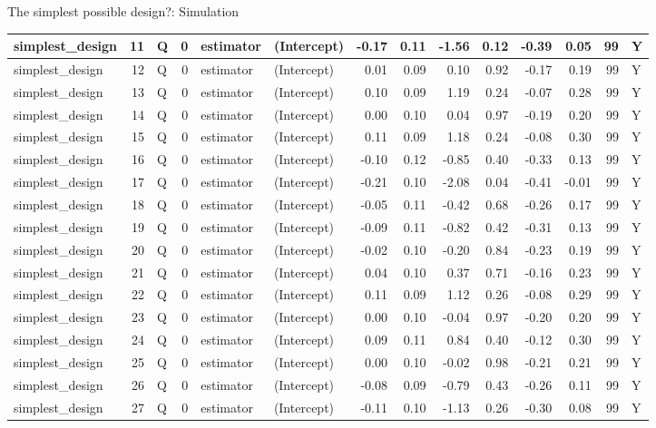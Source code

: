 \documentclass[
  11pt,
  ignorenonframetext,
]{beamer}
\begin{document}
\begin{frame}[fragile]{The simplest possible design?: Simulation}
\begin{tabular}{l|r|l|r|l|l|r|r|r|r|r|r|r|l}
\hline
simplest\_design & 11 & Q & 0 & estimator & (Intercept) & -0.17 & 0.11 & -1.56 & 0.12 & -0.39 & 0.05 & 99 & Y\\
\hline
simplest\_design & 12 & Q & 0 & estimator & (Intercept) & 0.01 & 0.09 & 0.10 & 0.92 & -0.17 & 0.19 & 99 & Y\\
\hline
simplest\_design & 13 & Q & 0 & estimator & (Intercept) & 0.10 & 0.09 & 1.19 & 0.24 & -0.07 & 0.28 & 99 & Y\\
\hline
simplest\_design & 14 & Q & 0 & estimator & (Intercept) & 0.00 & 0.10 & 0.04 & 0.97 & -0.19 & 0.20 & 99 & Y\\
\hline
simplest\_design & 15 & Q & 0 & estimator & (Intercept) & 0.11 & 0.09 & 1.18 & 0.24 & -0.08 & 0.30 & 99 & Y\\
\hline
simplest\_design & 16 & Q & 0 & estimator & (Intercept) & -0.10 & 0.12 & -0.85 & 0.40 & -0.33 & 0.13 & 99 & Y\\
\hline
simplest\_design & 17 & Q & 0 & estimator & (Intercept) & -0.21 & 0.10 & -2.08 & 0.04 & -0.41 & -0.01 & 99 & Y\\
\hline
simplest\_design & 18 & Q & 0 & estimator & (Intercept) & -0.05 & 0.11 & -0.42 & 0.68 & -0.26 & 0.17 & 99 & Y\\
\hline
simplest\_design & 19 & Q & 0 & estimator & (Intercept) & -0.09 & 0.11 & -0.82 & 0.42 & -0.31 & 0.13 & 99 & Y\\
\hline
simplest\_design & 20 & Q & 0 & estimator & (Intercept) & -0.02 & 0.10 & -0.20 & 0.84 & -0.23 & 0.19 & 99 & Y\\
\hline
simplest\_design & 21 & Q & 0 & estimator & (Intercept) & 0.04 & 0.10 & 0.37 & 0.71 & -0.16 & 0.23 & 99 & Y\\
\hline
simplest\_design & 22 & Q & 0 & estimator & (Intercept) & 0.11 & 0.09 & 1.12 & 0.26 & -0.08 & 0.29 & 99 & Y\\
\hline
simplest\_design & 23 & Q & 0 & estimator & (Intercept) & 0.00 & 0.10 & -0.04 & 0.97 & -0.20 & 0.20 & 99 & Y\\
\hline
simplest\_design & 24 & Q & 0 & estimator & (Intercept) & 0.09 & 0.11 & 0.84 & 0.40 & -0.12 & 0.30 & 99 & Y\\
\hline
simplest\_design & 25 & Q & 0 & estimator & (Intercept) & 0.00 & 0.10 & -0.02 & 0.98 & -0.21 & 0.21 & 99 & Y\\
\hline
simplest\_design & 26 & Q & 0 & estimator & (Intercept) & -0.08 & 0.09 & -0.79 & 0.43 & -0.26 & 0.11 & 99 & Y\\
\hline
simplest\_design & 27 & Q & 0 & estimator & (Intercept) & -0.11 & 0.10 & -1.13 & 0.26 & -0.30 & 0.08 & 99 & Y\\

\end{tabular}
\end{frame}
\end{document}
